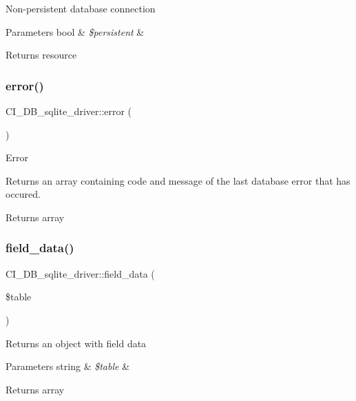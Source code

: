 Non-\/persistent database connection


\begin{DoxyParams}[1]{Parameters}
bool & {\em \$persistent} & \\
\hline
\end{DoxyParams}
\begin{DoxyReturn}{Returns}
resource 
\end{DoxyReturn}
\mbox{\label{class_c_i___d_b__sqlite__driver_aeb30b8b6fd04f59bc71c1ddd1d8ffabe}} 
\subsubsection{\texorpdfstring{error()}{error()}}
{\footnotesize\ttfamily C\+I\+\_\+\+D\+B\+\_\+sqlite\+\_\+driver\+::error (\begin{DoxyParamCaption}{ }\end{DoxyParamCaption})}

Error

Returns an array containing code and message of the last database error that has occured.

\begin{DoxyReturn}{Returns}
array 
\end{DoxyReturn}
\mbox{\label{class_c_i___d_b__sqlite__driver_aad55a8b90027cf7a4104929546a17393}} 
\subsubsection{\texorpdfstring{field\+\_\+data()}{field\_data()}}
{\footnotesize\ttfamily C\+I\+\_\+\+D\+B\+\_\+sqlite\+\_\+driver\+::field\+\_\+data (\begin{DoxyParamCaption}\item[{}]{\$table }\end{DoxyParamCaption})}

Returns an object with field data


\begin{DoxyParams}[1]{Parameters}
string & {\em \$table} & \\
\hline
\end{DoxyParams}
\begin{DoxyReturn}{Returns}
array 
\end{DoxyReturn}
\mbox{\label{class_c_i___d_b__sqlite__driver_a35a96392d3abd9611e8bb9eb6853e1d0}} 
